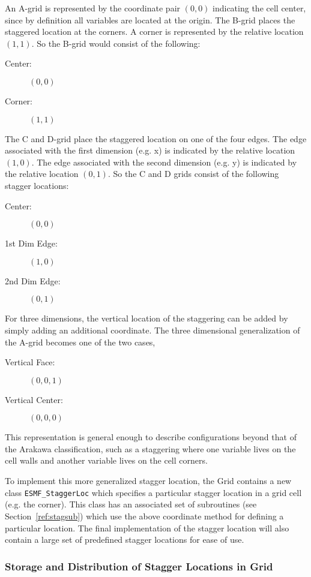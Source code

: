 An A-grid is represented by the coordinate pair $(0,0)$ indicating the cell center, since by definition all variables are located at the origin. The B-grid places the staggered location at the corners. A corner is represented
by the relative location $(1,1)$. So the B-grid would consist of the following:
\begin{description}
\item [Center:] $(0,0)$
\item [Corner:] $(1,1)$
\end{description}

The C and D-grid place the staggered location on one of the four edges. The edge associated with the first dimension (e.g. x) is indicated by the relative location $(1,0)$. The edge associated with the second dimension (e.g. y) is indicated by the relative location $(0,1)$. So the C and D grids consist of the following stagger locations:
\begin{description}
\item [Center:] $(0,0)$
\item [1st Dim Edge:] $(1,0)$
\item [2nd Dim Edge:] $(0,1)$
\end{description}

For three dimensions, the vertical location of the staggering can be added by simply adding an additional coordinate. The three dimensional generalization of the A-grid becomes one of the two cases,
\begin{description}
\item [Vertical Face:] $(0,0,1)$
\item [Vertical Center:] $(0,0,0)$
\end{description}
This representation is general enough to describe configurations beyond that of the Arakawa classification, such as a staggering where one variable lives on the cell walls and another variable lives on the cell corners.

To implement this more generalized stagger location, the Grid contains
a new class {\tt ESMF\_StaggerLoc} which specifies a particular stagger
location in a grid cell (e.g. the corner). This class has an
associated set of subroutines (see Section~\ref{ref:stagsub}) which use
the above coordinate method for defining a particular location. 
The final implementation of the stagger location will also contain a
large set of predefined stagger locations for ease of use. 

\subsubsection{Storage and Distribution of Stagger Locations in Grid}

